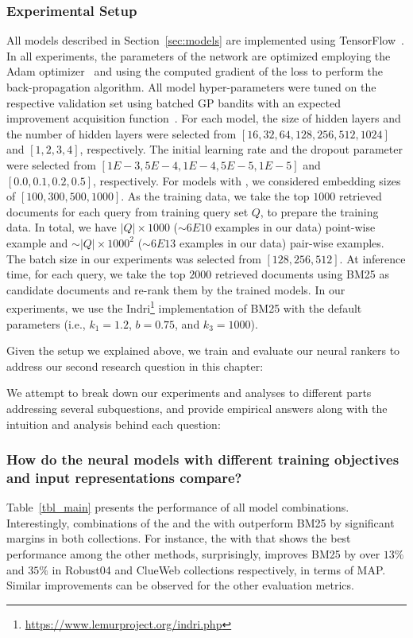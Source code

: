 \subsubsection{Experimental Setup}
All models described in Section~\ref{sec:models} are implemented using TensorFlow~\citep{tang2016:tflearn,tensorflow2015-whitepaper}.
In all experiments, the parameters of the network are optimized employing the Adam optimizer~\citep{Kingma:2014} and using the computed gradient of the loss to perform the back-propagation algorithm.
All model hyper-parameters were tuned on the respective validation set using batched GP bandits with an expected improvement acquisition function~\citep{Desautels:2014}. 
For each model, the size of hidden layers and the number of hidden layers were selected from $[16, 32, 64, 128, 256, 512, 1024]$ and $[1, 2, 3, 4]$, respectively. The initial learning rate and the dropout parameter were selected from $[1E-3, 5E-4, 1E-4, 5E-5, 1E-5]$ and $[0.0, 0.1, 0.2, 0.5]$, respectively. For models with \feedthree, we considered embedding sizes of $[100, 300, 500, 1000]$. As the training data, we take the top $1000$ retrieved documents for each query from training query set $Q$, to prepare the training data. In total, we have $|Q|\times 1000$ ($\sim6E10$ examples in our data) point-wise example and $\sim|Q|\times 1000^2$ ($\sim6E13$ examples in our data) pair-wise examples. The batch size in our experiments was selected from  $[128, 256, 512]$.
%
At inference time, for each query, we take the top $2000$ retrieved documents using BM25 as candidate documents and re-rank them by the trained models. In our experiments, we use the Indri\footnote{\url{https://www.lemurproject.org/indri.php}} implementation of BM25 with the default parameters (i.e., $k_1 = 1.2$, $b = 0.75$, and $k_3 = 1000$).


\bigskip
Given the setup we explained above, we train and evaluate our neural rankers to address our second research question in this chapter:

We attempt to break down our experiments and analyses to different parts addressing several subquestions, and provide empirical answers along with the intuition and analysis behind each question:

 
\subsubsection{How do the neural models with different training objectives and input representations compare?}
%
Table~\ref{tbl_main} presents the performance of all model combinations.
Interestingly, combinations of the \modeltwo and the \modelthree with \feedthree outperform BM25 by significant margins in both collections. For instance, the \modelthree with \feedthree that shows the best performance among the other methods, surprisingly, improves BM25 by over $13\%$ and $35\%$ in Robust04 and ClueWeb collections respectively, in terms of MAP. Similar improvements can be observed for the other evaluation metrics.

